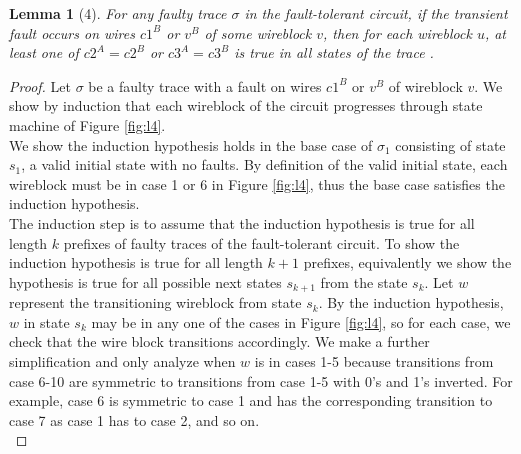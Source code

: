 \documentclass[12pt]{report}
\newtheorem*{lemma}{Lemma}
\begin{document}
\begin{lemma}[4]
For any faulty trace $\sigma$ in the fault-tolerant circuit, if the transient fault occurs on wires $c1^B$ or $v^B$ of some wireblock $v$, then for each wireblock $u$, at least one of $c2^A=c2^B$ or $c3^A=c3^B$ is true in all states of the trace .\end{lemma}
\begin{proof}
Let $\sigma$ be a faulty trace with a fault on wires $c1^B$ or $v^B$ of wireblock $v$.  We show by induction that each wireblock of the circuit progresses through state machine of Figure \ref{fig:l4}. 
\\ %

We show the induction hypothesis holds in the base case of $\sigma_1$ consisting of state $s_1$, a valid initial state with no faults.  By definition of the valid initial state, each wireblock must be in case 1 or 6 in Figure \ref{fig:l4}, thus the base case satisfies the induction hypothesis.\\

The induction step is to assume that the induction hypothesis is true for all length $k$ prefixes of faulty traces of the fault-tolerant circuit. 
To show the induction hypothesis is true for all length $k+1$ prefixes, equivalently we show the hypothesis is true for all possible next states $s_{k+1}$ from the state $s_k$. Let $w$ represent the transitioning wireblock from state $s_k$. By the induction hypothesis, $w$ in state $s_k$ may be in any one of the cases in Figure \ref{fig:l4}, so for each case, we check  that the wire block transitions accordingly. We make a further simplification and only analyze when $w$ is in cases 1-5 because transitions from case 6-10 are symmetric to transitions from case 1-5 with 0's and 1's inverted. For example, case 6 is symmetric to case 1 and has the corresponding transition to case 7 as case 1 has to case 2, and so on.\\


\end{proof}
\end{document}
